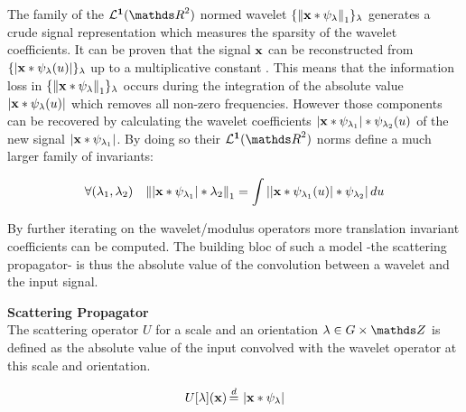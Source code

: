 \documentclass[a4paper,11pt]{report}
\begin{document}
      The family of the $\mathbf{\mcalL^{1}}(\dsR^{2})$ normed wavelet $\{ \left\lVert {\bf x} \ast \psi_{\lambda} \right\rVert_{1}\}_{\lambda}$ generates a crude signal representation which measures the sparsity of the wavelet coefficients. It can be proven that the signal ${\bf x}$ can be reconstructed from $\{\left| {\bf x} \ast \psi_{\lambda}(u) \right| \}_{\lambda}$ up to a multiplicative constant \cite{waldspurger2015phase}. This means that the information loss in $\{\left\lVert {\bf x} \ast \psi_{\lambda} \right\rVert_{1} \}_{\lambda}$ occurs during the integration of the absolute value $\left| {\bf x} \ast \psi_{\lambda}(u) \right|$ which removes all non-zero frequencies. However those components can be recovered by calculating the wavelet coefficients $\left| {\bf x} \ast \psi_{\lambda_{1}} \right| \ast \psi_{\lambda_{2}}(u)$ of the new signal $\left| {\bf x} \ast \psi_{\lambda_{1}} \right|$. By doing so their $\mathbf{\mcalL^{1}}(\dsR^{2})$ norms define a much larger family of invariants:
      
      \begin{equation*}
				\label{eq:2nd order}
				\forall (\lambda_{1}, \lambda_{2}) \;\;\; 
				\left\lVert  \left| {\bf x} \ast \psi_{\lambda_{1}} \right| \ast \lambda_{2} \right\rVert_{1} =
				\int \left|  \left| {\bf x} \ast \psi_{\lambda_{1}}(u) \right| \ast \psi_{\lambda_{2}} \right| du
      \end{equation*}          
      
      By further iterating on the wavelet/modulus operators more translation invariant coefficients can be computed. The building bloc of such a model -the scattering propagator- is thus the absolute value of the convolution between a wavelet and the input signal.
      
      \begin{defn} \textbf{Scattering Propagator}\\ 
				The scattering operator $U$ for a scale and an orientation $\lambda \in G \times \dsZ$ is defined as the absolute value of the input convolved with the wavelet operator at this scale and orientation.
				
				\begin{equation}
					\label{eq:scattering propagator}
					U[\lambda](\bfx) \eqdef \abs{\bfx \ast \psi_{\lambda}}
				\end{equation}
				\label{def:SO}
			\end{defn}
						
\end{document}
